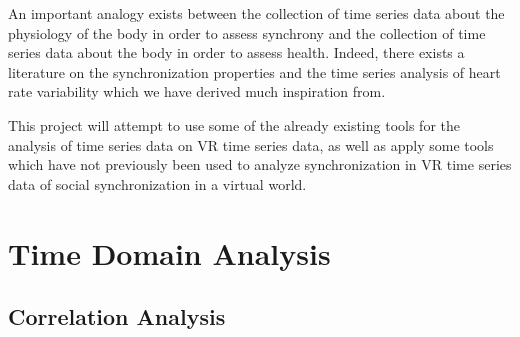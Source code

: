 \documentclass[12pt]{article}
\begin{document}
An important analogy exists between the collection of time series data about the physiology of the body in order to assess synchrony and the collection of time series data about the body in order to assess health. Indeed, there exists a literature on the synchronization properties and the time series analysis of heart rate variability which we have derived much inspiration from. %




This project will attempt to use some of the already existing tools for the analysis of time series data on VR time series data, as well as apply some tools which have not previously been used to analyze synchronization in VR time series data of social synchronization in a virtual world.


\section{Time Domain Analysis}

\subsection{Correlation Analysis}


\end{document}
